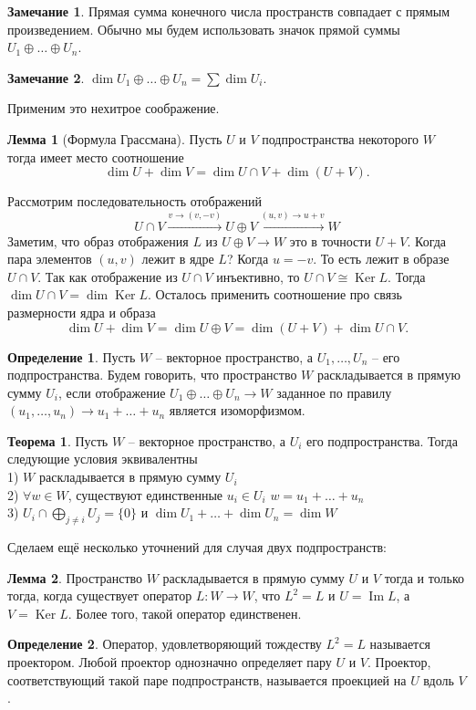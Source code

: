 \documentclass[10pt,a4paper,oneside]{book} %
\theoremstyle{definition}
\newtheorem*{rem}{Замечание}
\newtheorem*{defn}{Определение}
\newtheorem{thm}{Теорема}
\newtheorem{lem}{Лемма}
\DeclareMathOperator{\Ker}{Ker}
\newcommand{\im}{\operatorname{Im}}
\def\thrm{\begin{thm}}
\def\ethrm{\end{thm}}
\def\dfn{\begin{defn}}
\def\edfn{\end{defn}}
\def\lm{\begin{lem}}
\def\elm{\end{lem}}
\def\rm{\begin{rem}}
\def\erm{\end{rem}}
\begin{document}
\rm Прямая сумма конечного числа пространств совпадает с прямым произведением. Обычно мы будем использовать значок прямой суммы $U_1\oplus \dots \oplus U_n$.
\erm


\rm $\dim U_1\oplus \dots \oplus U_n= \sum \dim U_i$.
\erm

Применим это нехитрое соображение.


\lm[Формула Грассмана] Пусть $U$ и $V$ подпространства некоторого $W$ тогда имеет место соотношение
$$\dim U +\dim V = \dim U\cap V + \dim (U+V).$$

\proof Рассмотрим последовательность отображений
$$U\cap V \stackrel{v\to (v,-v)}{\longrightarrow} U\oplus V \stackrel{(u,v)\to u+v}{\longrightarrow} W$$
Заметим, что образ отображения $L$ из $U\oplus V \to W$ это в точности $U+V$. Когда пара элементов $(u,v)$ лежит в ядре $L$? Когда $u=-v$. То есть лежит в образе $U \cap V$. Так как отображение из $U\cap V$ инъективно, то $U\cap V \cong \Ker L$. Тогда $\dim U\cap V = \dim \Ker L $. Осталось применить соотношение про связь размерности ядра и образа
$$\dim U+ \dim V = \dim U\oplus V= \dim(U+V)+\dim U\cap V.$$
\endproof
\elm

\dfn Пусть $W$ -- векторное пространство, а $U_1,\dots,U_n$ -- его подпространства. Будем говорить, что пространство $W$ раскладывается в прямую сумму $U_i$, если отображение $U_1\oplus \dots \oplus U_n \to W$ заданное по правилу $(u_1,\dots,u_n) \to u_1 +\dots+u_n$ является изоморфизмом.
\edfn

\thrm
Пусть $W$ -- векторное пространство, а $U_i$ его подпространства. Тогда следующие условия эквивалентны\\
1) $W$ раскладывается в прямую сумму $U_i$ \\
2) $\forall w \in W$, существуют единственные $u_i \in U_i$  $w=u_1+\dots+u_n$\\
3) $U_i\cap \bigoplus_{j\neq i} U_j= \{0\}$ и $\dim U_1 +\dots+ \dim U_n =\dim W$\\
\ethrm

Сделаем ещё несколько уточнений для случая двух подпространств:

\lm Пространство $W$ раскладывается в прямую сумму $U$   и $V$ тогда и только тогда, когда существует оператор $L \colon W \to W$, что $L^2=L$ и $U=\im L$, а $V=\Ker L$. Более того, такой оператор единственен.
\elm

\dfn Оператор, удовлетворяющий тождеству $L^2=L$ называется проектором.
 Любой проектор однозначно определяет пару $U$ и $V$. Проектор, соответствующий такой паре подпространств, называется проекцией на $U$ вдоль $V$.
\edfn
\end{document}
